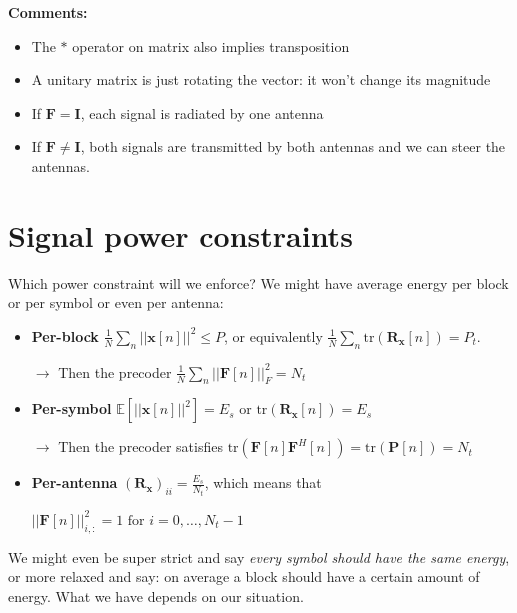 \documentclass[a4paper, 12pt]{book}
\begin{document}
{\begin{minipage}{\dimexpr\linewidth-2\fboxsep-2\fboxrule}
        \vspace{0.5em}
        \textbf{Comments:}
        \begin{itemize}
            \item The $*$ operator on matrix also implies transposition
            \item A unitary matrix is just rotating the vector: it won't change its magnitude
            \item If $\mathbf{F} = \mathbf{I}$, each signal is radiated by one antenna
            \item If $\mathbf{F} \neq \mathbf{I}$, both signals are transmitted by both antennas and we can steer the antennas.
        \end{itemize}
    \end{minipage}
}

\section[Signal power constraints]{Signal power constraints}

Which power constraint will we enforce? We might have average energy per block or per symbol or even per antenna:

\begin{itemize}
    \item[\textcolor{red}{$\blacksquare$}] \textbf{Per-block} $\frac{1}{N} \sum_{n} ||\mathbf{x}[n]||^2 \le P$, or equivalently $\frac{1}{N} \sum_{n} \text{tr}(\mathbf{R_x}[n]) = P_t$.
    
    {\small $\rightarrow$ Then the precoder $\frac{1}{N} \sum_{n} ||\mathbf{F}[n]||^2_F = N_t$}

    \item[\textcolor{red}{$\blacksquare$}] \textbf{Per-symbol} $\mathbb{E}[||\mathbf{x}[n]||^2] = E_s$ or $\text{tr}(\mathbf{R_x}[n]) = E_s$
    
    {\small $\rightarrow$ Then the precoder satisfies $\text{tr}(\mathbf{F}[n]\mathbf{F}^H[n]) = \text{tr}(\mathbf{P}[n]) = N_t$}
    
    \item[\textcolor{red}{$\blacksquare$}] \textbf{Per-antenna} $(\mathbf{R_x})_{ii} = \frac{E_s}{N_t}$, which means that
    
    {\small $||\mathbf{F}[n]||^2_{i,:} = 1 \text{ for } i = 0, \dots, N_t-1$}
\end{itemize}



We might even be super strict and say \textit{every symbol should have the same energy}, or more relaxed and say: on average a block should have a certain amount of energy.
What we have depends on our situation.
\end{document}
